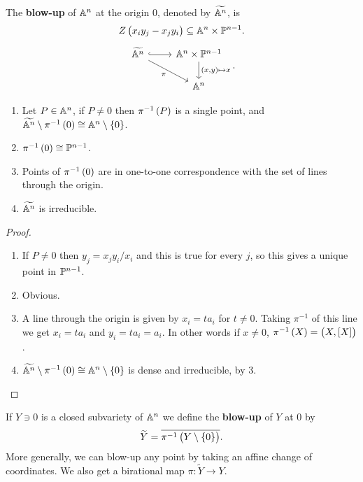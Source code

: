 \pagebreak

\begin{definition}
The \textbf{blow-up} of $ \A^n $ at the origin $ 0 $, denoted by $ \widetilde{\A^n} $, is
$$ Z\br{x_iy_j - x_jy_i} \subseteq \A^n \times \P^{n - 1}. $$
$$
\begin{tikzcd}
\widetilde{\A^n} \arrow[hookrightarrow]{r} \arrow[swap]{dr}{\pi} & \A^n \times \P^{n - 1} \arrow{d}{\br{x, y} \mapsto x} \\
& \A^n
\end{tikzcd}.
$$
\end{definition}

\begin{proposition}
\hfill
\begin{enumerate}
\item Let $ P \in \A^n $, if $ P \ne 0 $ then $ \pi^{-1}\br{P} $ is a single point, and $ \widetilde{\A^n} \setminus \pi^{-1}\br{0} \cong \A^n \setminus \cbr{0} $.
\item $ \pi^{-1}\br{0} \cong \P^{n - 1} $.
\item Points of $ \pi^{-1}\br{0} $ are in one-to-one correspondence with the set of lines through the origin.
\item $ \widetilde{\A^n} $ is irreducible.
\end{enumerate}
\end{proposition}

\begin{proof}
\hfill
\begin{enumerate}
\item If $ P \ne 0 $ then $ y_j = x_jy_i/x_i $ and this is true for every $ j $, so this gives a unique point in $ \P^{n - 1} $.
\item Obvious.
\item A line through the origin is given by $ x_i = ta_i $ for $ t \ne 0 $. Taking $ \pi^{-1} $ of this line we get $ x_i = ta_i $ and $ y_i = ta_i = a_i $. In other words if $ x \ne 0 $, $ \pi^{-1}\br{X} = \br{X, \sbr{X}} $.
\item $ \widetilde{\A^n} \setminus \pi^{-1}\br{0} \cong \A^n \setminus \cbr{0} $ is dense and irreducible, by $ 3 $.
\end{enumerate}
\end{proof}

\begin{definition}
If $ Y \ni 0 $ is a closed subvariety of $ \A^n $ we define the \textbf{blow-up} of $ Y $ at $ 0 $ by
$$ \widetilde{Y} = \overline{\pi^{-1}\br{Y \setminus \cbr{0}}}. $$
More generally, we can blow-up any point by taking an affine change of coordinates. We also get a birational map $ \pi : \widetilde{Y} \to Y $.
\end{definition}

